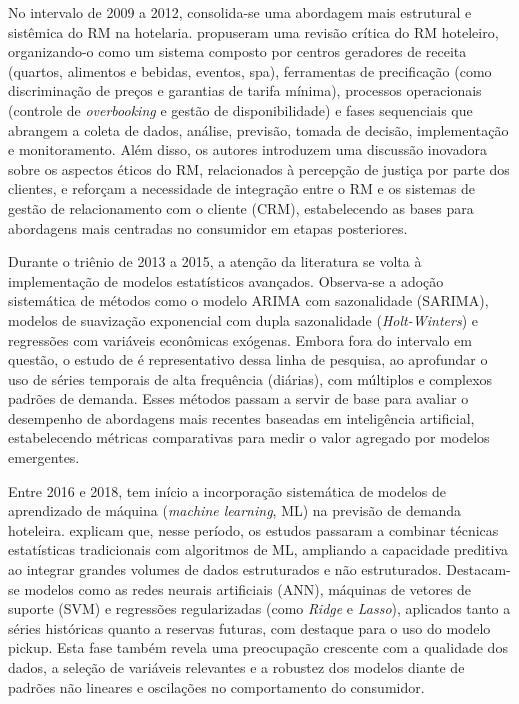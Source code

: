 No intervalo de 2009 a 2012, consolida-se uma abordagem mais estrutural e sistêmica do RM na hotelaria. \citet{Ivanov2011} propuseram uma revisão crítica do RM hoteleiro, organizando-o como um sistema composto por centros geradores de receita (quartos, alimentos e bebidas, eventos, spa), ferramentas de precificação (como discriminação de preços e garantias de tarifa mínima), processos operacionais (controle de \textit{overbooking} e gestão de disponibilidade) e fases sequenciais que abrangem a coleta de dados, análise, previsão, tomada de decisão, implementação e monitoramento. Além disso, os autores introduzem uma discussão inovadora sobre os aspectos éticos do RM, relacionados à percepção de justiça por parte dos clientes, e reforçam a necessidade de integração entre o RM e os sistemas de gestão de relacionamento com o cliente (CRM), estabelecendo as bases para abordagens mais centradas no consumidor em etapas posteriores.

Durante o triênio de 2013 a 2015, a atenção da literatura se volta à implementação de modelos estatísticos avançados. Observa-se a adoção sistemática de métodos como o modelo ARIMA com sazonalidade (SARIMA), modelos de suavização exponencial com dupla sazonalidade (\textit{Holt-Winters}) e regressões com variáveis econômicas exógenas. Embora fora do intervalo em questão, o estudo de \citet{PEREIRA201613} é representativo dessa linha de pesquisa, ao aprofundar o uso de séries temporais de alta frequência (diárias), com múltiplos e complexos padrões de demanda. Esses métodos passam a servir de base para avaliar o desempenho de abordagens mais recentes baseadas em inteligência artificial, estabelecendo métricas comparativas para medir o valor agregado por modelos emergentes.

Entre 2016 e 2018, tem início a incorporação sistemática de modelos de aprendizado de máquina (\textit{machine learning}, ML) na previsão de demanda hoteleira. \citet{henriques2024hotel} explicam que, nesse período, os estudos passaram a combinar técnicas estatísticas tradicionais com algoritmos de ML, ampliando a capacidade preditiva ao integrar grandes volumes de dados estruturados e não estruturados. Destacam-se modelos como as redes neurais artificiais (ANN), máquinas de vetores de suporte (SVM) e regressões regularizadas (como \textit{Ridge} e \textit{Lasso}), aplicados tanto a séries históricas quanto a reservas futuras, com destaque para o uso do modelo pickup. Esta fase também revela uma preocupação crescente com a qualidade dos dados, a seleção de variáveis relevantes e a robustez dos modelos diante de padrões não lineares e oscilações no comportamento do consumidor.

